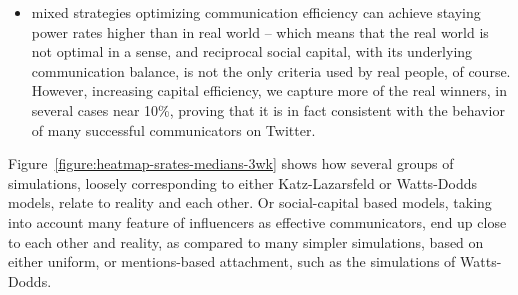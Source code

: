 \documentclass[10pt,oneside]{memoir}
\begin{document}
\begin{itemize}
\item mixed strategies optimizing communication efficiency can achieve staying power rates higher than in real world -- which means that the real world is not optimal in a sense, and reciprocal social capital, with its underlying communication balance, is not the only criteria used by real people, of course.  However, increasing capital efficiency, we capture more of the real winners, in several cases near 10\%, proving that it is in fact consistent with the behavior of many successful communicators on Twitter.



\end{itemize}

Figure~\ref{figure:heatmap-srates-medians-3wk} shows how several groups of simulations, loosely corresponding to either Katz-Lazarsfeld or Watts-Dodds models, relate to reality and each other.  Or social-capital based models, taking into account many feature of influencers as effective communicators, end up close to each other and reality, as compared to many simpler simulations, based on either uniform, or mentions-based attachment, such as the simulations of Watts-Dodds.
\end{document}
